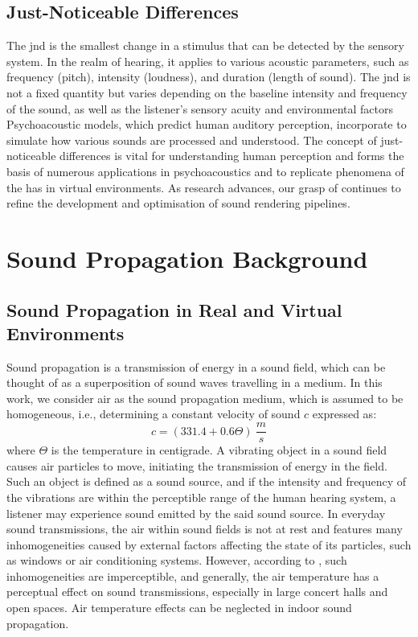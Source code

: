\subsection{Just-Noticeable Differences}
The \acrfull{jnd} is the smallest change in a stimulus that can be detected by the sensory system. In the realm of hearing, it applies to various acoustic parameters, such as frequency (pitch), intensity (loudness), and duration (length of sound). The \acrshort{jnd} is not a fixed quantity but varies depending on the baseline intensity and frequency of the sound, as well as the listener's sensory acuity and environmental factors \citep{dolhasz2021perceptually}
Psychoacoustic models, which predict human auditory perception, incorporate  to simulate how various sounds are processed and understood.  The concept of just-noticeable differences is vital for understanding human perception and forms the basis of numerous applications in psychoacoustics and to replicate phenomena of the \acrshort{has} in virtual environments. As research advances, our grasp of  continues to refine the development and optimisation of sound rendering pipelines.

\section{Sound Propagation Background}
\subsection{Sound Propagation in Real and Virtual Environments}
Sound propagation is a transmission of energy in a sound field, which can be thought of as a superposition of sound waves travelling in a medium. In this work, we consider air as the sound propagation medium, which is assumed to be homogeneous, i.e., determining a constant velocity of sound $c$ expressed as: 
\begin{equation}
c = (331.4 + 0.6\Theta)~\frac{m}{s}   
\end{equation}
where $\Theta$ is the temperature in centigrade.
A vibrating object in a sound field causes air particles to move, initiating the transmission of energy in the field. Such an object is defined as a sound source, and if the intensity and frequency of the vibrations are within the perceptible range of the human hearing system, a listener may experience sound emitted by the said sound source.
In everyday sound transmissions, the air within sound fields is not at rest and features many inhomogeneities caused by external factors affecting the state of its particles, such as windows or air conditioning systems. However, according to \citep{kuttruff2016room}, such inhomogeneities are imperceptible, and generally, the air temperature has a perceptual effect on sound transmissions, especially in large concert halls and open spaces. Air temperature effects can be neglected in indoor sound propagation.

